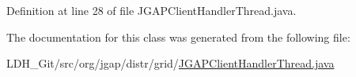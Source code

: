 Definition at line 28 of file J\-G\-A\-P\-Client\-Handler\-Thread.\-java.



The documentation for this class was generated from the following file\-:\begin{DoxyCompactItemize}
\item 
L\-D\-H\-\_\-\-Git/src/org/jgap/distr/grid/\hyperlink{_j_g_a_p_client_handler_thread_8java}{J\-G\-A\-P\-Client\-Handler\-Thread.\-java}\end{DoxyCompactItemize}
